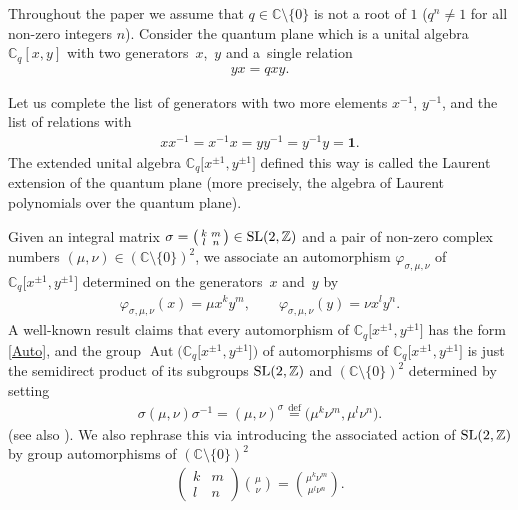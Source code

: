 \documentclass[10pt,a4paper]{amsart}
\numberwithin{equation}{section}
\begin{document}
Throughout the paper we assume that $q\in\mathbb{C}{\setminus}\{0\}$ is not a root of $1$ ($q^n\ne 1$ for all non-zero integers $n$). Consider the quantum plane which is a unital algebra $\mathbb{C}_q[x,y]$ with two genera\-tors~$x$,~$y$ and a~single relation
\begin{gather}\label{qpr}
yx=qxy.
\end{gather}

Let us complete the list of generators with two more elements $x^{-1}$, $y^{-1}$, and the list of relations with
\begin{gather}\label{Lpr}
xx^{-1}=x^{-1}x=yy^{-1}=y^{-1}y=\mathbf{1}.
\end{gather}
The extended unital algebra $\mathbb{C}_q\big[x^{\pm 1},y^{\pm 1}\big]$ defined this way is called the Laurent extension of the quantum plane (more precisely, the algebra of Laurent polynomials over the quantum plane).

Given an integral matrix $\sigma=\left(\begin{smallmatrix}k & m\\ l & n\end{smallmatrix}\right)\in {\rm SL}(2,\mathbb{Z})$ and a pair of non-zero complex numbers $(\mu,\nu)\in(\mathbb{C}{\setminus}\{0\})^2$, we associate an automorphism $\varphi_{\sigma,\mu,\nu}$ of $\mathbb{C}_q\big[x^{\pm 1},y^{\pm 1}\big]$ determined on the generators~$x$ and~$y$ by
\begin{gather}\label{Auto}
\varphi_{\sigma,\mu,\nu}(x)=\mu x^ky^m, \qquad \varphi_{\sigma,\mu,\nu}(y)=\nu x^ly^n.
\end{gather}
A well-known result claims that every automorphism of $\mathbb{C}_q\big[x^{\pm 1},y^{\pm 1}\big]$ has the form \eqref{Auto}, and the group $\operatorname{Aut}\big(\mathbb{C}_q\big[x^{\pm 1},y^{\pm 1}\big]\big)$ of automorphisms of $\mathbb{C}_q\big[x^{\pm 1},y^{\pm 1}\big]$ is just the semidirect product of its subgroups ${\rm SL}(2,\mathbb{Z})$ and $(\mathbb{C}{\setminus}\{0\})^2$ determined by setting~\cite{KPS}
\begin{gather*}
\sigma(\mu,\nu)\sigma^{-1}=(\mu,\nu)^\sigma
\stackrel{\operatorname{def}}{=}\big(\mu^k\nu^m,\mu^l\nu^n\big).
\end{gather*}
(see also \cite{AD,PLCCN}). We also rephrase this via introducing the associated action of ${\rm SL}(2,\mathbb{Z})$ by group automorphisms of $(\mathbb{C}{\setminus}\{0\})^2$
\begin{gather}\label{sl_ac}
\begin{pmatrix}k & m\\ l & n\end{pmatrix}\binom{\mu}{\nu}=\binom{\mu^k\nu^m}{\mu^l\nu^n}.
\end{gather}
\end{document}
